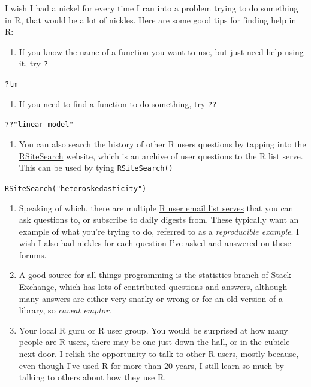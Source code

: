 \documentclass[
]{book}
\providecommand{\tightlist}{%
  \setlength{\itemsep}{0pt}\setlength{\parskip}{0pt}}
\begin{document}
I wish I had a nickel for every time I ran into a problem trying to do
something in R, that would be a lot of nickles. Here are some good tips
for finding help in R:

\begin{enumerate}
\def\labelenumi{\arabic{enumi})}
\tightlist
\item
  If you know the name of a function you want to use, but just need
  help using it, try \texttt{?}
\end{enumerate}

\texttt{?lm}

\begin{enumerate}
\def\labelenumi{\arabic{enumi})}
\setcounter{enumi}{1}
\tightlist
\item
  If you need to find a function to do something, try \texttt{??}
\end{enumerate}

\texttt{??"linear\ model"}

\begin{enumerate}
\def\labelenumi{\arabic{enumi})}
\setcounter{enumi}{2}
\tightlist
\item
  You can also search the history of other R users questions by
  tapping into the
  \href{http://finzi.psych.upenn.edu/search.html}{RSiteSearch} website,
  which is an archive of user questions to the R list serve. This can
  be used by tying \texttt{RSiteSearch()}
\end{enumerate}

\texttt{RSiteSearch("heteroskedasticity")}

\begin{enumerate}
\def\labelenumi{\arabic{enumi})}
\setcounter{enumi}{3}
\item
  Speaking of which, there are multiple \href{https://www.r-project.org/mail.html}{R user email list
  serves} that you can ask
  questions to, or subscribe to daily digests from. These typically
  want an example of what you're trying to do, referred to as a
  \emph{reproducible example}. I wish I also had nickles for each question
  I've asked and answered on these forums.
\item
  A good source for all things programming is the statistics branch of
  \href{https://stats.stackexchange.com}{Stack Exchange}, which has lots of
  contributed questions and answers, although many answers are either
  very snarky or wrong or for an old version of a library, so \emph{caveat
  emptor}.
\item
  Your local R guru or R user group. You would be surprised at how
  many people are R users, there may be one just down the hall, or in
  the cubicle next door. I relish the opportunity to talk to other R
  users, mostly because, even though I've used R for more than 20
  years, I still learn so much by talking to others about how they
  use R.
\end{enumerate}
\end{document}
